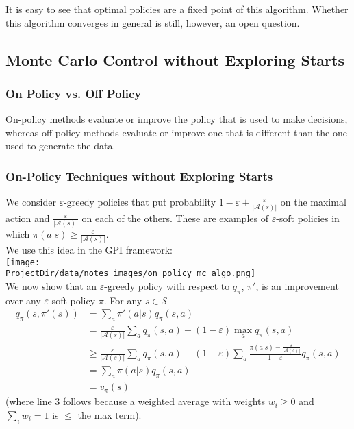 It is easy to see that optimal policies are a fixed point of this algorithm. Whether this algorithm converges in general is still, however, an open question.

\subsection{Monte Carlo Control without Exploring Starts}
\subsubsection*{On Policy vs. Off Policy}
On-policy methods evaluate or improve the policy that is used to make decisions, whereas off-policy methods evaluate or improve one that is different than the one used to generate the data.

\subsubsection*{On-Policy Techniques without Exploring Starts}
We consider $\varepsilon$-greedy policies that put probability $1 - \varepsilon + \frac{\varepsilon}{|\mathcal{A}(s)|}$ on the maximal action and $\frac{\varepsilon}{|\mathcal{A}(s)|}$ on each of the others. These are examples of $\varepsilon$-soft policies in which $\pi(a|s) \geq \frac{\varepsilon}{|\mathcal{A}(s)|}$.\\

We use this idea in the GPI framework:\\

\texttt{[image: \\ProjectDir/data/notes\_images/on\_policy\_mc\_algo.png]}\\

We now show that an $\varepsilon$-greedy policy with respect to $q_\pi$, $\pi'$, is an improvement over any $\varepsilon$-soft policy $\pi$. For any $s \in \mathcal{S}$
\begin{align}
    q_\pi(s, \pi'(s)) &= \sum_a \pi'(a|s) q_\pi(s, a) \\ 
                      &= \frac{\varepsilon}{|\mathcal{A}(s)|} \sum_a q_\pi(s, a) + (1 - \varepsilon)\max_a q_\pi(s, a) \\
                      &\geq \frac{\varepsilon}{|\mathcal{A}(s)|} \sum_a q_\pi(s, a) + (1 - \varepsilon)\sum_a\frac{\pi(a|s) - \frac{\varepsilon}{|\mathcal{A}(s)|}}{1 - \varepsilon} q_\pi(s, a) \\
                      &= \sum_a \pi(a|s) q_\pi(s, a)\\
                      &= v_\pi(s)
\end{align}
(where line 3 follows because a weighted average with weights $w_i \geq 0$ and $\sum_i w_i = 1$ is $\leq$ the max term).\\

